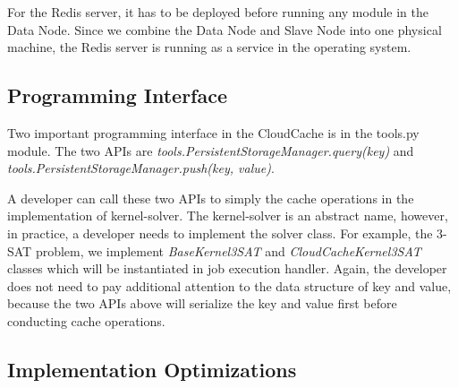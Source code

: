 For the Redis server, it has to be deployed before running any module in the Data Node. Since we combine the Data Node and Slave Node into one physical machine, the Redis server is running as a service in the operating system.

\subsection{Programming Interface}
Two important programming interface in the CloudCache is in the tools.py module. The two APIs are \emph{tools.PersistentStorageManager.query(key)} and \emph{tools.PersistentStorageManager.push(key, value)}. 

A developer can call these two APIs to simply the cache operations in the implementation of kernel-solver. The kernel-solver is an abstract name, however, in practice, a developer needs to implement the solver class. For example, the 3-SAT problem, we implement \emph{BaseKernel3SAT} and \emph{CloudCacheKernel3SAT} classes which will be instantiated in job execution handler. Again, the developer does not need to pay additional attention to the data structure of key and value, because the two APIs above will serialize the key and value first before conducting cache operations.

\subsection{Implementation Optimizations}
